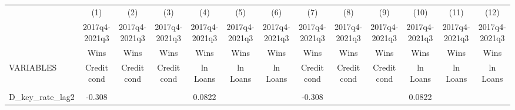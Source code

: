 \documentclass[]{article}
\begin{document}
\begin{center}
\begin{tabular}{lcccccccccccc} \hline
 & (1) & (2) & (3) & (4) & (5) & (6) & (7) & (8) & (9) & (10) & (11) & (12) \\
 & 2017q4-2021q3 & 2017q4-2021q3 & 2017q4-2021q3 & 2017q4-2021q3 & 2017q4-2021q3 & 2017q4-2021q3 & 2017q4-2021q3 & 2017q4-2021q3 & 2017q4-2021q3 & 2017q4-2021q3 & 2017q4-2021q3 & 2017q4-2021q3 \\
 & Wins & Wins & Wins & Wins & Wins & Wins & Wins & Wins & Wins & Wins & Wins & Wins \\
VARIABLES & Credit cond & Credit cond & Credit cond & ln Loans & ln Loans & ln Loans & Credit cond & Credit cond & Credit cond & ln Loans & ln Loans & ln Loans \\ \hline
\vspace{4pt} & \begin{footnotesize}\end{footnotesize} & \begin{footnotesize}\end{footnotesize} & \begin{footnotesize}\end{footnotesize} & \begin{footnotesize}\end{footnotesize} & \begin{footnotesize}\end{footnotesize} & \begin{footnotesize}\end{footnotesize} & \begin{footnotesize}\end{footnotesize} & \begin{footnotesize}\end{footnotesize} & \begin{footnotesize}\end{footnotesize} & \begin{footnotesize}\end{footnotesize} & \begin{footnotesize}\end{footnotesize} & \begin{footnotesize}\end{footnotesize} \\
D\_key\_rate\_lag2 & -0.308 &  &  & 0.0822 &  &  & -0.308 &  &  & 0.0822 &  &  \\

\end{tabular}
\end{center}
\end{document}
